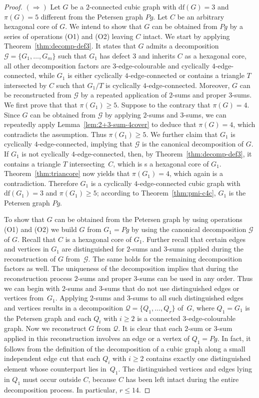 \documentclass[10pt,a4paper]{amsart}
\newcommand{\df}[1]{\ensuremath{\mathrm{df}({#1})}\xspace}
\begin{document}
\begin{proof}
$(\Rightarrow)$ Let $G$ be a $2$-connected cubic graph with
$\df{G}=3$ and $\pi(G)=5$ different from the Petersen graph
$Pg$. Let $C$ be an arbitrary hexagonal core of $G$. We intend
to show that $G$ can be obtained from $Pg$ by a series of
operations (O1) and (O2) leaving $C$ intact.  We start by
applying Theorem~\ref{thm:decomp-def3}. It states that $G$
admits a decomposition $\mathcal{G}=\{G_1,\ldots,G_m\}$ such
that $G_1$ has defect $3$ and inherits $C$ as a hexagonal core,
all other decomposition factors are $3$-edge-colourable and
cyclically $4$-edge-connected, while $G_1$ is either cyclically
$4$-edge-connected or contains a triangle $T$ intersected by
$C$ such that $G_1/T$ is cyclically $4$-edge-connected.
Moreover, $G$ can be reconstructed from $\mathcal{G}$ by a
repeated application of $2$-sums and proper $3$-sums. We first
prove that that $\pi(G_1)\ge 5$. Suppose to the contrary that
$\pi(G)=4$. Since $G$ can be obtained from $\mathcal{G}$ by
applying $2$-sums and $3$-sums, we can repeatedly apply
Lemma~\ref{lem:2+3-sum-4cover} to deduce that $\pi(G)=4$, which
contradicts the assumption. Thus $\pi(G_1)\ge 5$. 
We further claim that $G_1$ is
cyclically $4$-edge-connected, implying that $\mathcal{G}$ is
the canonical decomposition of $G$. If $G_1$ is not cyclically
$4$-edge-connected, then, by Theorem~\ref{thm:decomp-def3}, it
contains a triangle $T$ intersecting~$C$, which is s a
hexagonal core of $G_1$. Theorem~\ref{thm:triancore} now yields
that $\pi(G_1)=4$, which again is a contradiction. Therefore
$G_1$ is a cyclically $4$-edge-connected cubic graph with
$\df{G_1}=3$ and $\pi(G_1)\ge 5$; according to
Theorem~\ref{thm:pmi-c4c}, $G_1$ is the Petersen graph $Pg$.

To show that $G$ can be obtained from the Petersen graph by
using operations (O1) and (O2) we build $G$ from $G_1=Pg$ by
using the canonical decomposition $\mathcal{G}$ of $G$. Recall
that $C$ is a hexagonal core of $G_1$. Further recall that
certain edges and vertices in $G_1$ are distinguished for
$2$-sums and $3$-sums applied during the reconstruction of $G$
from~$\mathcal{G}$. The same holds for the remaining
decomposition factors as well. The uniqueness of the
decomposition implies that during the reconstruction process
$2$-sums and proper $3$-sums can be used in any order. Thus we
can begin with $2$-sums and $3$-sums that do not use
distinguished edges or vertices from~$G_1$. Applying $2$-sums
and $3$-sums to all such distinguished edges and vertices
results in a decomposition $\mathcal{Q}=\{Q_1,\ldots, Q_r\}$
of~$G$, where $Q_1=G_1$ is the Petersen graph and each $Q_i$
with $i\ge 2$ is a connected $3$-edge-colourable graph. Now we
reconstruct $G$ from $\mathcal{Q}$. It is clear that each
$2$-sum or $3$-sum applied in this reconstruction involves an
edge or a vertex of $Q_1=Pg$. In fact, it follows from the
definition of the decomposition of a cubic graph along a small
independent edge cut that each $Q_i$ with $i\ge 2$ contains
exactly one distinguished element whose counterpart lies
in~$Q_1$. The distinguished vertices and edges lying in $Q_1$
must occur outside $C$, because $C$ has been left intact during
the entire decomposition process. In particular, $r\le 14$.


\end{proof}
\end{document}
